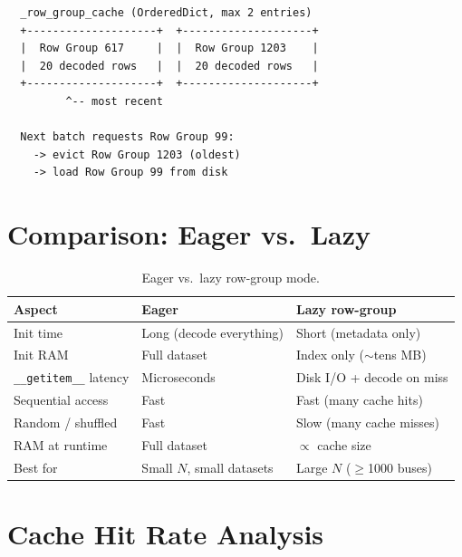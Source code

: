 \documentclass{article}
\begin{document}
\begin{lstlisting}
  _row_group_cache (OrderedDict, max 2 entries)
  +--------------------+  +--------------------+
  |  Row Group 617     |  |  Row Group 1203    |
  |  20 decoded rows   |  |  20 decoded rows   |
  +--------------------+  +--------------------+
         ^-- most recent

  Next batch requests Row Group 99:
    -> evict Row Group 1203 (oldest)
    -> load Row Group 99 from disk
\end{lstlisting}

\section{Comparison: Eager vs.\ Lazy}

\begin{table}[h]
\centering
\caption{Eager vs.\ lazy row-group mode.}
\label{tab:eager_vs_lazy}
\begin{tabular}{lll}
\toprule
Aspect & Eager & Lazy row-group \\
\midrule
Init time        & Long (decode everything)   & Short (metadata only) \\
Init RAM         & Full dataset               & Index only ($\sim$tens MB) \\
\texttt{\_\_getitem\_\_} latency
                 & Microseconds               & Disk I/O + decode on miss \\
Sequential access & Fast                      & Fast (many cache hits) \\
Random / shuffled & Fast                      & Slow (many cache misses) \\
RAM at runtime   & Full dataset               & $\propto$ cache size \\
Best for         & Small $N$, small datasets  & Large $N$ ($\geq$1000 buses) \\
\bottomrule
\end{tabular}
\end{table}

\section{Cache Hit Rate Analysis}
\end{document}
